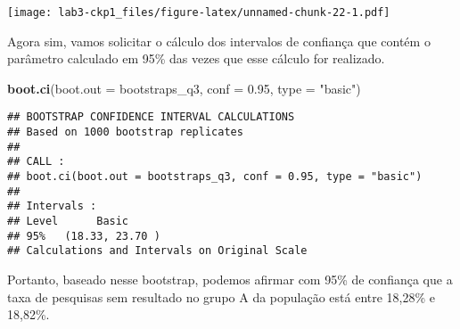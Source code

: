 \documentclass[]{article}
\newenvironment{Shaded}{\begin{snugshade}}{\end{snugshade}}
\newcommand{\KeywordTok}[1]{\textcolor[rgb]{0.13,0.29,0.53}{\textbf{#1}}}
\newcommand{\DataTypeTok}[1]{\textcolor[rgb]{0.13,0.29,0.53}{#1}}
\newcommand{\DecValTok}[1]{\textcolor[rgb]{0.00,0.00,0.81}{#1}}
\newcommand{\FloatTok}[1]{\textcolor[rgb]{0.00,0.00,0.81}{#1}}
\newcommand{\StringTok}[1]{\textcolor[rgb]{0.31,0.60,0.02}{#1}}
\newcommand{\OperatorTok}[1]{\textcolor[rgb]{0.81,0.36,0.00}{\textbf{#1}}}
\newcommand{\NormalTok}[1]{#1}
\begin{document}
\begin{Shaded}
\end{Shaded}

\texttt{[image: lab3-ckp1\_files/figure-latex/unnamed-chunk-22-1.pdf]}

Agora sim, vamos solicitar o cálculo dos intervalos de confiança que
contém o parâmetro calculado em 95\% das vezes que esse cálculo for
realizado.

\begin{Shaded}
\begin{Highlighting}[]
\KeywordTok{boot.ci}\NormalTok{(}\DataTypeTok{boot.out =}\NormalTok{ bootstraps_q3, }\DataTypeTok{conf =} \FloatTok{0.95}\NormalTok{, }\DataTypeTok{type =} \StringTok{"basic"}\NormalTok{)}
\end{Highlighting}
\end{Shaded}

\begin{verbatim}
## BOOTSTRAP CONFIDENCE INTERVAL CALCULATIONS
## Based on 1000 bootstrap replicates
## 
## CALL : 
## boot.ci(boot.out = bootstraps_q3, conf = 0.95, type = "basic")
## 
## Intervals : 
## Level      Basic         
## 95%   (18.33, 23.70 )  
## Calculations and Intervals on Original Scale
\end{verbatim}

Portanto, baseado nesse bootstrap, podemos afirmar com 95\% de confiança
que a taxa de pesquisas sem resultado no grupo A da população está entre
18,28\% e 18,82\%.
\end{document}
